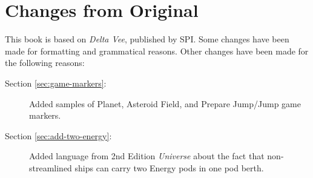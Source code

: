 \chapter{Changes from Original}
\label{cha:changes-from-original}

This book is based on \emph{Delta Vee}, published by SPI.  Some
changes have been made for formatting and grammatical reasons.  Other
changes have been made for the following reasons:


\begin{description}
\item[Section \ref{sec:game-markers}:]  Added samples of Planet,
  Asteroid Field, and Prepare Jump/Jump game markers.
\item[Section \ref{sec:add-two-energy}:] Added language from 2nd
  Edition \emph{Universe} about the fact that non-streamlined ships
  can carry two Energy pods in one pod berth.
\end{description}

